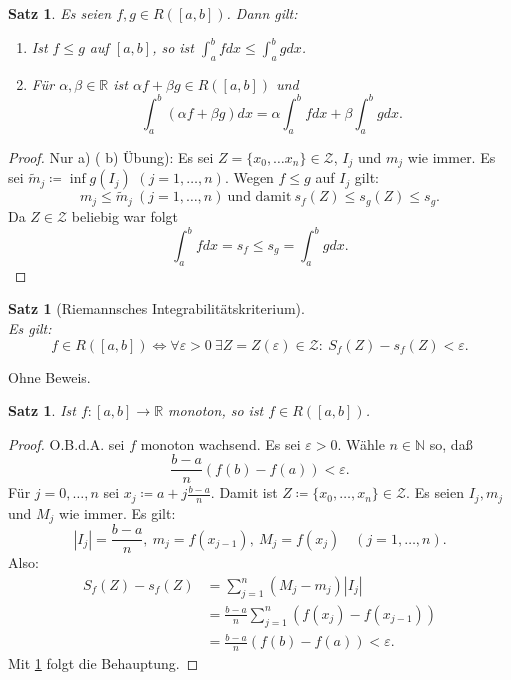 \documentclass[12pt]{extreport} %
\newcommand{\N}{\mathbb{N}}
\newcommand{\R}{\mathbb{R}}
\theoremstyle{named}
\theoremstyle{itshape}
\newtheorem{satz}[unnamedtheorem]{Satz}
\theoremstyle{normal}
\begin{document}
{\begin{satz} \label{10.2:satz}
	Es seien $f, g \in R([a, b])$. Dann gilt:
	\begin{enumerate}
		\item Ist $f \leq g$ auf $[a, b]$, so ist $\int_{a}^{b} f dx \leq \int_{a}^{b} g dx$.
		\item Für $\alpha, \beta \in \R$ ist $\alpha f + \beta g \in R([a, b])$ und
			$$ \int_{a}^{b} (\alpha f + \beta g) dx = \alpha \int_{a}^{b} f dx + \beta \int_{a}^{b} g dx. $$
	\end{enumerate}
\end{satz}

\begin{proof}
	Nur a) ( b) Übung): Es sei $Z = \{ x_{0}, \dotsc x_{n} \} \in \mathcal{Z}$, $I_{j}$ und $m_{j}$ wie immer. 
	        Es sei $\widetilde{m}_{j} \coloneqq \inf g(I_{j})$ $(j = 1, \dotsc, n)$. Wegen $f \leq g$ auf $I_{j}$ gilt:
		$$ m_{j} \leq \widetilde{m}_{j} ~ (j = 1, \dotsc, n) ~ \text{und damit} ~ s_{f}(Z) \leq s_{g}(Z) \leq s_{g}. $$ 
		Da $Z\in \mathcal{Z}$ beliebig war folgt 
		$$ \int_{a}^{b} f dx = s_{f} \leq s_g= \int_{a}^{b} g dx. $$
\end{proof}

\begin{satz}[Riemannsches Integrabilitätskriterium] \label{10.3:prop} ~\\
Es gilt: $$f \in R([a, b]) \iff \forall \varepsilon > 0 ~\exists Z = Z(\varepsilon) \in \mathcal{Z}: ~ S_{f}(Z) - s_{f}(Z) < \varepsilon. $$	
\end{satz}

Ohne Beweis.

\begin{satz} \label{10.4:satz}
	Ist $f:[a,b] \to \R$ monoton, so ist $f \in R([a, b])$.
\end{satz}

\begin{proof}
	O.B.d.A. sei $f$ monoton wachsend. Es sei $\varepsilon > 0$. Wähle $n \in \N$ so, da{\ss} 
	$$ \frac{b - a}{n} (f(b) - f(a)) < \varepsilon. $$
	Für $j = 0, \dotsc, n$ sei $x_{j} \coloneqq a + j \frac{b - a}{n}$. Damit ist $Z \coloneqq \{ x_{0}, \dotsc, x_{n} \} \in \mathcal{Z}$. Es seien $I_{j}, m_{j}$ und $M_{j}$ 
	wie immer. Es gilt: 
	$$
	|I_{j}| = \frac{b - a}{n}, ~ m_{j} = f(x_{j-1}), ~ M_{j} = f(x_{j}) \quad (j=1,\dotsc,n).
	$$
	Also:  
	\begin{align*}
		S_{f}(Z) - s_{f}(Z) & = \sum_{j=1}^{n} (M_{j} - m_{j})|I_{j}| \\
		& = \frac{b - a}{n} \sum_{j=1}^{n} ( f(x_{j}) - f(x_{j-1}) ) \\
		& = \frac{b - a}{n} ( f(b) - f(a) ) < \varepsilon.
	\end{align*} 
	Mit \ref{10.3:prop} folgt die Behauptung.
\end{proof}


}
\end{document}
